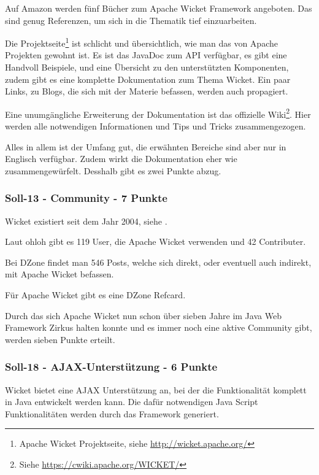   Auf Amazon werden fünf Bücher zum Apache Wicket Framework
  angeboten. Das sind genug Referenzen, um sich in die Thematik tief
  einzuarbeiten.
  
  Die Projektseite\footnote{Apache Wicket Projektseite, siehe
  \url{http://wicket.apache.org/}} ist schlicht und übersichtlich, wie man das
  von Apache Projekten gewohnt ist. Es ist das JavaDoc zum \ac{API} verfügbar,
  es gibt eine Handvoll Beispiele, und eine Übersicht zu den unterstützten
  Komponenten, zudem gibt es eine komplette Dokumentation zum Thema Wicket. Ein
  paar Links, zu Blogs, die sich mit der Materie befassen, werden auch
  propagiert.
  
  Eine unumgängliche Erweiterung der Dokumentation ist das offizielle
  Wiki\footnote{Siehe \url{https://cwiki.apache.org/WICKET/}}. Hier werden alle
  notwendigen Informationen und Tips und Tricks zusammengezogen.
  
  Alles in allem ist der Umfang gut, die erwähnten Bereiche sind aber nur in
  Englisch verfügbar. Zudem wirkt die Dokumentation eher wie zusammengewürfelt.
  Desshalb gibt es zwei Punkte abzug.
 
  \subsubsection{Soll-13 - Community - 7 Punkte}
  
  Wicket existiert seit dem Jahr 2004, siehe \cite{WikiWicket}.

  Laut ohloh gibt es 119 User, die Apache Wicket verwenden und 42 Contributer.

  Bei DZone findet man 546 Posts, welche sich direkt, oder eventuell auch
  indirekt, mit Apache Wicket befassen.

  Für Apache Wicket gibt es eine DZone Refcard.
  
  Durch das sich Apache Wicket nun schon über sieben Jahre im Java Web Framework
  Zirkus halten konnte und es immer noch eine aktive Community gibt, werden
  sieben Punkte erteilt.
  
  \subsubsection{Soll-18 - AJAX-Unterstützung - 6 Punkte}
  
  Wicket bietet eine AJAX Unterstützung an, bei der die Funktionalität komplett
  in Java entwickelt werden kann. Die dafür notwendigen Java Script
  Funktionalitäten werden durch das Framework generiert.
  
